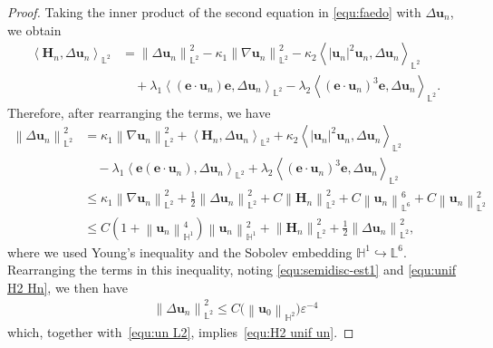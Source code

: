 \documentclass[11pt, reqno]{amsart}
\theoremstyle{definition}
\numberwithin{equation}{section}
\newcommand{\bff}{\boldsymbol}
\newcommand{\bb}{\mathbb}
\newcommand{\bl}[1]{{\color{blue}{#1}}}
\newcommand{\norm}[2]{\left\|{#1}\right\|_{#2}}
\newcommand{\inpro}[2]{\left\langle#1,#2\right\rangle}
\begin{document}
\begin{proof}
Taking the inner product of the second equation in \eqref{equ:faedo} with $\Delta \bff{u}_n$, we obtain
	\begin{align*}
		\inpro{\bff{H}_n}{\Delta \bff{u}_n}_{\bb{L}^2}
		&=
		\norm{\Delta \bff{u}_n}{\bb{L}^2}^2
		-
		\kappa_1 \norm{\nabla \bff{u}_n}{\bb{L}^2}^2
		-
		\kappa_2 \inpro{|\bff{u}_n|^2 \bff{u}_n}{\Delta \bff{u}_n}_{\bb{L}^2}
		\\
		&\quad
		+
		\lambda_1 \inpro{(\bff{e}\cdot \bff{u}_n)\bff{e}}{\Delta \bff{u}_n}_{\bb{L}^2}
		-
		\lambda_2 \inpro{(\bff{e}\cdot \bff{u}_n)^3 \bff{e}}{\Delta \bff{u}_n}_{\bb{L}^2}.
	\end{align*}
	Therefore, after rearranging the terms, we have
	\begin{align}\label{equ:Delta un L2 2}
		\nonumber
		\norm{\Delta \bff{u}_n}{\bb{L}^2}^2
		&=
		\kappa_1 \norm{\nabla \bff{u}_n}{\bb{L}^2}^2
		+
		\inpro{\bff{H}_n}{\Delta \bff{u}_n}_{\bb{L}^2}
		+
		\kappa_2 \inpro{|\bff{u}_n|^2 \bff{u}_n}{\Delta \bff{u}_n}_{\bb{L}^2}
		\\
		&\quad
		-
		\lambda_1 \inpro{\bff{e}(\bff{e}\cdot \bff{u}_n)}{\Delta \bff{u}_n}_{\bb{L}^2}
		+
		\lambda_2 \inpro{(\bff{e}\cdot \bff{u}_n)^3 \bff{e}}{\Delta \bff{u}_n}_{\bb{L}^2}
		\nonumber\\
		\nonumber
		&\leq
		\kappa_1 \norm{\nabla \bff{u}_n}{\bb{L}^2}^2
		+
		\frac{1}{2} \norm{\Delta \bff{u}_n}{\bb{L}^2}^2
		+
		C\norm{\bff{H}_n}{\bb{L}^2}^2
		+
		C \norm{\bff{u}_n}{\bb{L}^6}^6
		+
		C \norm{\bff{u}_n}{\bb{L}^2}^2
		\\
		&\leq
		C\left(1+ \norm{\bff{u}_n}{\bb{H}^1}^4 \right) \norm{\bff{u}_n}{\bb{H}^1}^2 
		+ 
		\norm{\bff{H}_n}{\bb{L}^2}^2
		+
		\frac{1}{2}  \norm{\Delta \bff{u}_n}{\bb{L}^2}^2,
	\end{align}
	where we used Young's inequality and the Sobolev embedding $\bb{H}^1\hookrightarrow \bb{L}^6$. Rearranging the terms in this inequality, noting \eqref{equ:semidisc-est1} and \eqref{equ:unif H2 Hn}, we then have
	\begin{align}\label{equ:lambda e Delta un C}
		\norm{\Delta \bff{u}_n}{\bb{L}^2}^2
		\leq 
		C\big(\norm{\bff{u}_0}{\bb{H}^2}\big) \varepsilon^{-4} 
	\end{align}
    which, together with~\eqref{equ:un L2}, implies~\eqref{equ:H2 unif un}.


\end{proof}
\end{document}
